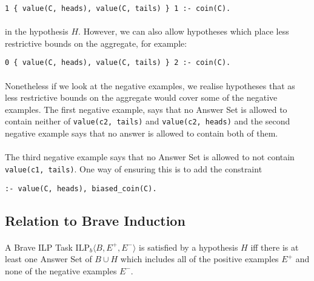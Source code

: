 \documentclass{article}
\theoremstyle{plain}
\theoremstyle{definition}
\begin{document}
\begin{multicols}{2}
\begin{lstlisting}
1 { value(C, heads), value(C, tails) } 1 :- coin(C).
\end{lstlisting}

\paragraph{} in the hypothesis $H$. However, we can also allow hypotheses which place less restrictive bounds on the aggregate, for example:

\begin{lstlisting}
0 { value(C, heads), value(C, tails) } 2 :- coin(C).
\end{lstlisting}

\paragraph{} Nonetheless if we look at the negative examples, we realise hypotheses that as less restrictive bounds on the aggregate would cover some of the negative examples. The first negative example, says that no Answer Set is allowed to contain neither of \lstinline{value(c2, tails)} and \lstinline{value(c2, heads)} and the second negative example says that no answer is allowed to contain both of them. 

\paragraph{} The third negative example says that no Answer Set is allowed to not contain \lstinline{value(c1, tails)}. One way of ensuring this is to add the constraint

\begin{lstlisting}
:- value(C, heads), biased_coin(C).
\end{lstlisting}

\subsection{Relation to Brave Induction}

\paragraph{} A Brave ILP Task $\text{ILP}_b\langle B, E^+, E^-\rangle$ is satisfied by a hypothesis $H$ iff there is at least one Answer Set of $B \cup H$ which includes all of the positive examples $E^+$ and none of the negative examples $E^-$.


\end{multicols}
\end{document}

